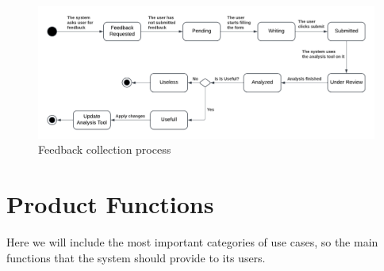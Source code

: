 \begin{enumerate}
\begin{figure}[H]
    \centering
    \includegraphics[width=1\linewidth]{RASD//Images/feedback2.png}
    \caption{Feedback collection process}
    \label{fig:enter-label}
\end{figure}

\end{enumerate}

\pagebreak
\section{Product Functions}

Here we will include the most important categories of use cases, so the main functions that the system should provide to its users.

